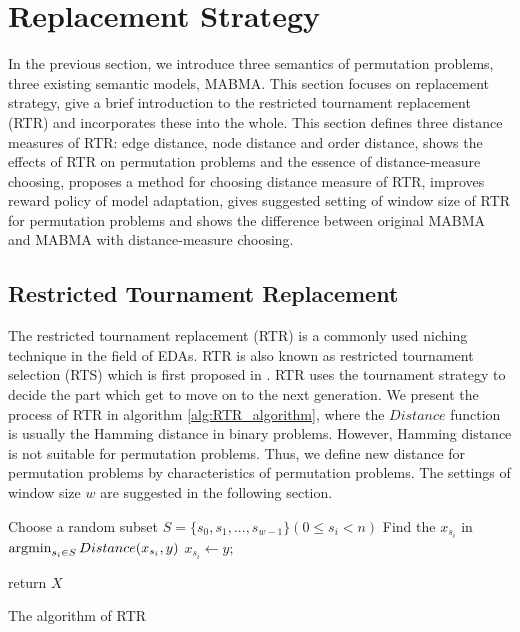 \section{Replacement Strategy}
\label{ch:replacement_strategy}

In the previous section, we introduce three semantics of permutation problems, three existing semantic models, MABMA. This section focuses on replacement strategy, give a brief introduction to the restricted tournament replacement (RTR) and incorporates these into the whole. This section defines three distance measures of RTR: edge distance, node distance and order distance, shows the effects of RTR on permutation problems and the essence of distance-measure choosing, proposes a method for choosing distance measure of RTR, improves reward policy of model adaptation, gives suggested setting of window size of RTR for permutation problems and shows the difference between original MABMA and MABMA with distance-measure choosing.




\subsection{Restricted Tournament Replacement}
The restricted tournament replacement (RTR) is a commonly used niching technique in the field of EDAs. RTR is also known as restricted tournament selection (RTS) which is first proposed in \citep{Harik1995}. RTR uses the tournament strategy to decide the part which get to move on to the next generation. We present the process of RTR in algorithm \ref{alg:RTR_algorithm}, where the $Distance$ function is usually the Hamming distance in binary problems. However, Hamming distance is not suitable for permutation problems. Thus, we define new distance for permutation problems by characteristics of permutation problems. The settings of window size $w$ are suggested in the following section.


\begin{algorithm}[htbp]
    {
        Choose a random subset $S =\lbrace s_0, s_1, ..., s_{w-1}\rbrace (0\leq s_i <n)$\;
        Find the $x_{s_i}$ in $\mathop{\argmin}_{{s_i} \in S} Distance(x_{s_i},y)$\;
              {
        $x_{s_i} \leftarrow y$;
        }
        
    }
    return $X$\;
    \caption{The algorithm of RTR}
    \label{alg:RTR_algorithm}
\end{algorithm}



